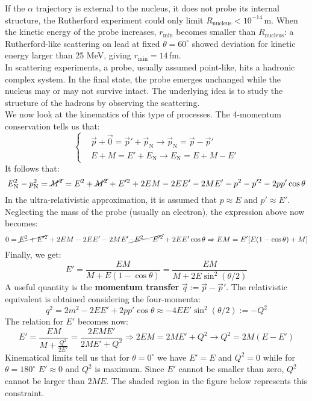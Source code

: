 \documentclass[10.75pt,a4paper,openright,bottom=2cm]{article}
\begin{document}
If the $\alpha$ trajectory is external to the nucleus, it does not probe its internal structure, the Rutherford experiment could only limit $R_{\text{nucleus}}<10^{-14}$\,m. When the kinetic energy of the probe increases, $r_{\min}$ becomes smaller than $R_{\text{nucleus}}$: a Rutherford-like scattering on lead at fixed $\theta=60^\circ$ showed deviation for kinetic energy larger than 25 MeV, giving $r_{\min}=14$\,fm.\\
In scattering experiments, a probe, usually assumed point-like, hits a hadronic complex system. In the final state, the probe emerges unchanged while the nucleus may or may not survive intact. The underlying idea is to study the structure of the hadrons by observing the scattering.\\
We now look at the kinematics of this type of processes. The 4-momentum conservation tells us that:
\[
\left\{
\begin{aligned}
&\Vec{p}+\Vec{0}=\Vec{p}'+\Vec{p}_{\text{N}}\to\Vec{p}_{\text{N}}=\Vec{p}-\Vec{p}'\\
&E+M=E'+E_{\text{N}}\to E_{\text{N}}=E+M-E'
\end{aligned}
\right.
\]
It follows that:
\[
E_{\text{N}}^2-p_{\text{N}}^2=\cancel{M^2}=E^2+\cancel{M^2}+E'^2+2EM-2EE'-2ME'-p^2-p'^2-2pp'\cos\theta
\]
In the ultra-relativistic approximation, it is assumed that $p\approx E$ and $p'\approx E'$. Neglecting the mass of the probe (usually an electron), the expression above now becomes:
\[
0=\cancel{E^2+E'^2}+2EM-2EE'-2ME'\cancel{-E^2-E'^2}+2EE'\cos\theta\Rightarrow EM=E'[E(1-\cos\theta)+M]
\]
Finally, we get:
\[
E'=\frac{EM}{M+E(1-\cos\theta)}=\frac{EM}{M+2E\sin^2(\theta/2)}
\]
A useful quantity is the \textbf{momentum transfer} $\Vec{q}:=\Vec{p}-\Vec{p}'$. The relativistic equivalent is obtained considering the four-momenta:
\[
q^2=2m^2-2EE'+2pp'\cos\theta\approx-4EE'\sin^2(\theta/2):=-Q^2
\]
The relation for $E'$ becomes now:
\[
E'=\frac{EM}{M+\frac{Q^2}{2E'}}=\frac{2EME'}{2ME'+Q^2}\Rightarrow 2EM=2ME'+Q^2\to Q^2=2M(E-E')
\]
Kinematical limits tell us that for $\theta=0^\circ$ we have $E'=E$ and $Q^2=0$ while for $\theta=180^\circ$ $E'\approx0$ and $Q^2$ is maximum. Since $E'$ cannot be smaller than zero, $Q^2$ cannot be larger than $2ME$. The shaded region in the figure below represents this constraint.\\
\begin{center}
\end{center}
\end{document}
